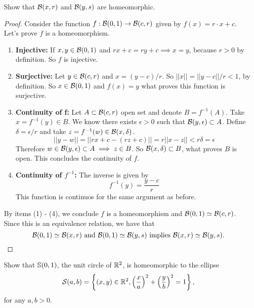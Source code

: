 \begin{exercise}
    Show that $\mathcal{B}(x, r)$ and $\mathcal{B}(y, s)$ are homeomorphic.
\end{exercise}

\begin{proof}

Consider the function $f: \mathcal{B}(0, 1) \to \mathcal{B}(c, r)$ given by $f(x) = r\cdot x + c$. Let's
prove $f$ is a homeomorphism. 
\begin{enumerate}
    \item \textbf{Injective:} If $x,y \in \mathcal{B}(0,1)$ and $rx + c = ry + c
    \implies x = y$, because $r > 0$ by 
    definition. So $f$ is injective. 
    
    \item \textbf{Surjective:}  Let $y \in \mathcal{B}(c, r)$ and $x = (y - c)/r$. So
    $||x|| = ||y - c||/r < 1$, by definition. So $x \in \mathcal{B}(0,1)$ and $f(x) =
    y$ what proves this function is surjective. 

    \item \textbf{Continuity of f:} Let $A \subset \mathcal{B}(c,r)$ open set and
    denote $B = f^{-1}(A)$. Take $x = f^{-1}(y) \in B$. We know there exists
    $\epsilon > 0$ such that $\mathcal{B}(y, \epsilon) \subset A$. Define $\delta = \epsilon/r$ and
    take $z = f^{-1}(w) \in \mathcal{B}(x,\delta)$. 
    $$
    ||y-w|| = ||rx + c - (rz + c)|| = r||x - z|| < r\delta = \epsilon 
    $$
    Therefore $w \in \mathcal{B}(y, \epsilon) \subset A \implies z \in B$. So
    $\mathcal{B}(x,\delta) \subset B$, what proves $B$ is open. This concludes the
    continuity of $f$. 
    
    \item \textbf{Continuity of $f^{-1}$:} The inverse is given by 
    $$
    f^{-1}(y) = \frac{y - c}{r}
    $$
    This function is continuos for the same argument as before. 
\end{enumerate}

By items (1) - (4), we conclude $f$ is a homeomorphism and $\mathcal{B}(0,1) \simeq
\mathcal{B}(c,r)$. Since this is an equivalence relation, we have that
$$
\mathcal{B}(0,1) \simeq \mathcal{B}(x,r) \text{ and } \mathcal{B}(0,1) \simeq \mathcal{B}(y, s) \text{ implies } \mathcal{B}(x,r) \simeq \mathcal{B}(y,s).
$$
    
\end{proof}

\noindent\linia

\begin{exercise}
    Show that $\mathbb{S}(0, 1)$, the unit circle of $\mathbb{R}^2$, is homeomorphic
    to the ellipse 
    $$
    \mathcal{S}(a,b) = \left\{(x,y) \in \mathbb{R}^2,\left(\frac{x}{a}\right)^2 + \left(\frac{y}{b}\right)^2 = 1 \right\},
    $$
    for any $a, b > 0$. 
\end{exercise}

